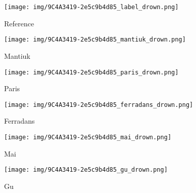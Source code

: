 \documentclass[journal]{IEEEtran}
\begin{document}
\begin{figure*}[tb]
        \centering
        \begin{subfigure}[b]{0.245\textwidth}  
            \centering 
            \texttt{[image: img/9C4A3419-2e5c9b4d85\_label\_drown.png]}
            \caption[]%
            {{\small Reference }}    
            \label{fig:mean and std of net24}
        \end{subfigure}
        \begin{subfigure}[b]{0.245\textwidth}  
            \centering 
            \texttt{[image: img/9C4A3419-2e5c9b4d85\_mantiuk\_drown.png]}
            \caption[]%
            {{\small Mantiuk \cite{mantiuk2008display} }}    
            \label{fig:mean and std of net24}
        \end{subfigure}
        \begin{subfigure}[b]{0.245\textwidth}   
            \centering 
            \texttt{[image: img/9C4A3419-2e5c9b4d85\_paris\_drown.png]}
            \caption[]%
            {{\small Paris \cite{paris2015local} }}    
            \label{fig:mean and std of net34}
        \end{subfigure}
        \begin{subfigure}[b]{0.245\textwidth}   
            \centering 
            \texttt{[image: img/9C4A3419-2e5c9b4d85\_ferradans\_drown.png]}
            \caption[]%
            {{\small Ferradans \cite{ferradans2011analysis}     }}    
            \label{fig:mean and std of net44}
        \end{subfigure}
        \label{fig:mean and std of nets}
        \centering
        \begin{subfigure}[b]{0.245\textwidth}
            \centering
            \texttt{[image: img/9C4A3419-2e5c9b4d85\_mai\_drown.png]}
            \caption[]%
            {{\small Mai \cite{mai2011optimizing} }}    
            \label{fig:mean and std of net14}
        \end{subfigure}
        \begin{subfigure}[b]{0.245\textwidth}
            \centering
            \texttt{[image: img/9C4A3419-2e5c9b4d85\_gu\_drown.png]}
            \caption[]%
            {{\small Gu \cite{gu2013local} }}    
            \label{fig:mean and std of net14}

\end{subfigure}
\end{figure*}
\end{document}

